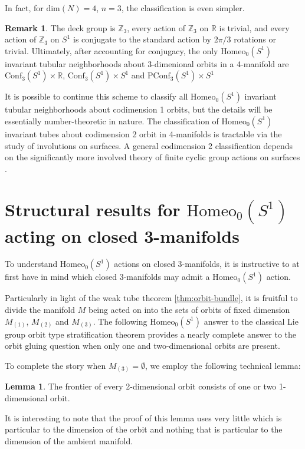 \documentclass[10pt, oneside]{article}
\newcommand{\R}{\mathbb{R}}
\newcommand{\Z}{\mathbb{Z}}
\newcommand{\homeo}[1][S^1]{\text{Homeo}_0(#1)}
\newcommand{\conf}[2][S^1]{\text{Conf}_{#2}(#1)}
\newcommand{\pconf}[2][S^1]{\text{PConf}_{#2}(#1)}
\theoremstyle{definition}
\newtheorem{rem}{Remark}[section]
\newtheorem{lem}{Lemma}[section]
\theoremstyle{definition}
\begin{document}
In fact, for $\text{dim}(N) = 4$, $n=3$, the classification is even simpler.

\begin{rem}
    The deck group is $\Z_3$, every action of $\Z_3$ on $\R$ is trivial, and every action of $\Z_3$ on $S^1$ is conjugate to the standard action by $2\pi/3$ rotations or trivial. Ultimately, after accounting for conjugacy, the only $\homeo$ invariant tubular neighborhoods about 3-dimenional orbits in a 4-manifold are $\conf[S^1]{3}\times \R$, $\conf[S^1]{3}\times S^1$ and $\pconf[S^1]{3}\times S^1$
\end{rem}

It is possible to continue this scheme to classify all $\homeo$ invariant tubular neighborhoods about codimension 1 orbits, but the details will be essentially number-theoretic in nature. The classification of $\homeo$ invariant tubes about codimension 2 orbit in 4-manifolds is tractable via the study of involutions on surfaces\cite{dugger:InvolutionsSurfaces}. A general codimension 2 classification depends on the significantly more involved theory of finite cyclic group actions on surfaces \cite{harvey:CyclicGroups}\cite{ding:ClassificationCyclic}.


\section{Structural results for \texorpdfstring{$\homeo$}{Homeo\_0(S\string^1)} acting on closed 3-manifolds}\label{sec:homeos1}

To understand $\homeo$ actions on closed 3-manifolds, it is instructive to at first have in mind which closed 3-manifolds may admit a $\homeo$ action.

\thmglobaltop*

Particularly in light of the weak tube theorem \cref{thm:orbit-bundle}, it is fruitful to divide the manifold $M$ being acted on into the sets of orbits of fixed dimension $M_{(1)}$, $M_{(2)}$ and $M_{(3)}$. The following $\homeo$ answer to the classical Lie group orbit type stratification theorem provides a nearly complete answer to the orbit gluing question when only one and two-dimensional orbits are present.

\weakotstratif*

To complete the story when $M_{(3)}=\emptyset$, we employ the following technical lemma:
\begin{lem}
    The frontier of every 2-dimensional orbit consists of one or two 1-dimensional orbit.
\end{lem}
It is interesting to note that the proof of this lemma uses very little which is particular to the dimension of the orbit and nothing that is particular to the dimension of the ambient manifold.
\end{document}
